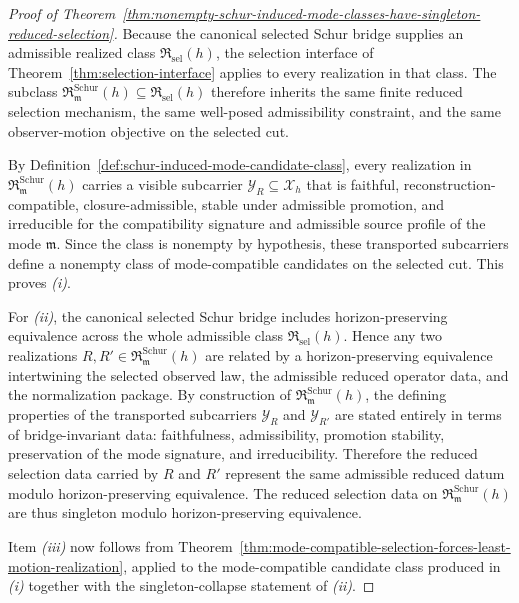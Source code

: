 \begin{proof}[Proof of Theorem~\ref{thm:nonempty-schur-induced-mode-classes-have-singleton-reduced-selection}]
\label{proof:thm:nonempty-schur-induced-mode-classes-have-singleton-reduced-selection}
Because the canonical selected Schur bridge supplies an admissible realized
class \(\mathfrak R_{\mathrm{sel}}(h)\), the selection interface of
Theorem~\ref{thm:selection-interface} applies to every realization in that
class. The subclass
\(\mathfrak R^{\mathrm{Schur}}_{\mathfrak m}(h)\subseteq \mathfrak R_{\mathrm{sel}}(h)\)
therefore inherits the same finite reduced selection mechanism, the same
well-posed admissibility constraint, and the same observer-motion objective on
the selected cut.

By Definition~\ref{def:schur-induced-mode-candidate-class}, every realization
in \(\mathfrak R^{\mathrm{Schur}}_{\mathfrak m}(h)\) carries a visible
subcarrier \(\mathcal Y_R\subseteq \mathcal X_h\) that is faithful,
reconstruction-compatible, closure-admissible, stable under admissible
promotion, and irreducible for the compatibility signature and admissible
source profile of the mode \(\mathfrak m\). Since the class is nonempty by
hypothesis, these transported subcarriers define a nonempty class of
mode-compatible candidates on the selected cut. This proves \emph{(i)}.

For \emph{(ii)}, the canonical selected Schur bridge includes
horizon-preserving equivalence across the whole admissible class
\(\mathfrak R_{\mathrm{sel}}(h)\). Hence any two realizations
\(R,R'\in \mathfrak R^{\mathrm{Schur}}_{\mathfrak m}(h)\) are related by a
horizon-preserving equivalence intertwining the selected observed law, the
admissible reduced operator data, and the normalization package. By
construction of
\(\mathfrak R^{\mathrm{Schur}}_{\mathfrak m}(h)\), the defining properties of
the transported subcarriers \(\mathcal Y_R\) and \(\mathcal Y_{R'}\) are stated
entirely in terms of bridge-invariant data: faithfulness, admissibility,
promotion stability, preservation of the mode signature, and irreducibility.
Therefore the reduced selection data carried by \(R\) and \(R'\) represent the
same admissible reduced datum modulo horizon-preserving equivalence. The
reduced selection data on
\(\mathfrak R^{\mathrm{Schur}}_{\mathfrak m}(h)\) are thus singleton modulo
horizon-preserving equivalence.

Item \emph{(iii)} now follows from
Theorem~\ref{thm:mode-compatible-selection-forces-least-motion-realization},
applied to the mode-compatible candidate class produced in \emph{(i)} together
with the singleton-collapse statement of \emph{(ii)}.
\end{proof}


